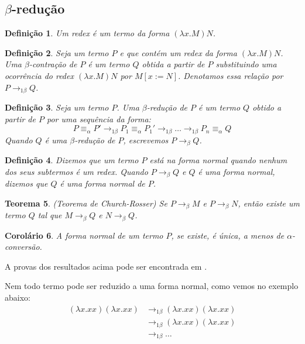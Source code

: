 \documentclass[12pt]{article}
\newtheorem{definition}{Definição}
\newtheorem{theorem}[definition]{Teorema}
\newtheorem{corollary}[definition]{Corolário}
\begin{document}
\subsection{$\beta$-redução}

\begin{definition}
  Um redex é um termo da forma $(\lambda x.M)N$.  
\end{definition}

\begin{definition}
  Seja um termo $P$ e que contém um redex da forma $(\lambda x.M)N$. Uma $\beta$-contração de $P$ é um termo $Q$ obtida a partir de $P$ substituindo uma ocorrência do redex $(\lambda x.M)N$ por $M[x := N]$. Denotamos essa relação por $P \to_{1 \beta}Q$.
\end{definition}

\begin{definition}
  Seja um termo $P$. Uma $\beta$-redução de $P$ é um termo $Q$ obtido a partir de $P$ por uma sequência da forma:
  $$P \equiv_\alpha P' \to_{1 \beta} P_1 \equiv_\alpha P_1' \to_{1 \beta} \ldots \to_{1 \beta} P_n \equiv_\alpha Q$$
  Quando $Q$ é uma $\beta$-redução de $P$, escrevemos $P \to_\beta Q$.
\end{definition}

\begin{definition}
  Dizemos que um termo $P$ está na forma normal quando nenhum dos seus subtermos é um redex. Quando $P \to_\beta Q$ e $Q$ é uma forma normal, dizemos que $Q$ é uma forma normal de $P$.   
\end{definition}

\begin{theorem}(Teorema de Church-Rosser)
  Se $P \to_\beta M$ e $P \to_\beta N$, então existe um termo $Q$ tal que $M \to_\beta Q$ e $N \to_\beta Q$.   
\end{theorem}

\begin{corollary}
  A forma normal de um termo $P$, se existe, é única, a menos de $\alpha$-conversão.
\end{corollary}

A provas dos resultados acima pode ser encontrada em \cite{hindley2008lambda}.

Nem todo termo pode ser reduzido a uma forma normal, como vemos no exemplo abaixo:
$$\begin{aligned}
  (\lambda x. xx)(\lambda x. xx)
  & \to_{1\beta} (\lambda x. xx)(\lambda x. xx) \\
  & \to _{1\beta}(\lambda x. xx)(\lambda x. xx) \\
  & \to_{1\beta} \ldots
  \end{aligned}
$$
\end{document}
